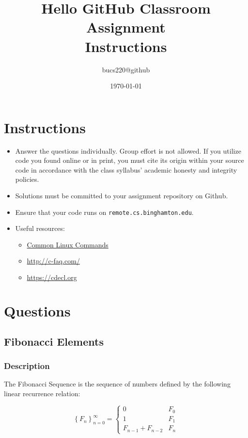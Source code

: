 \documentclass{article}
\begin{document}
  \title{Hello GitHub Classroom Assignment \\ Instructions}
  \author{bucs220@github}
  \date{\today}
  \maketitle

\section{Instructions}
\begin{itemize}
  \item Answer the questions individually. Group effort is not allowed. If you utilize code you found online or in print, you must cite its origin within your source code in accordance with the class syllabus' academic honesty and integrity policies.
  \item Solutions must be committed to your assignment repository on Github.
  \item Ensure that your code runs on \texttt{remote.cs.binghamton.edu}.
  \item Useful resources:
  \begin{itemize}
    \item \href{http://www.informit.com/blogs/blog.aspx?uk=The-10-Most-Important-Linux-Commands}{Common Linux Commands}
    \item \url{http://c-faq.com/}
    \item \url{https://cdecl.org}
  \end{itemize}
\end{itemize}

\section{Questions}
\subsection{Fibonacci Elements}
\subsubsection{Description}
The Fibonacci Sequence is the sequence of numbers defined by the following linear recurrence relation:

\begin{equation}
  \left \{     F_n     \right \}_{n=0}^{\infty } = \begin{cases}
    0 & F_0\\
    1 & F_1 \\
    F_{n-1} + F_{n-2} & F_n
  \end{cases}
\end{equation}
\end{document}
